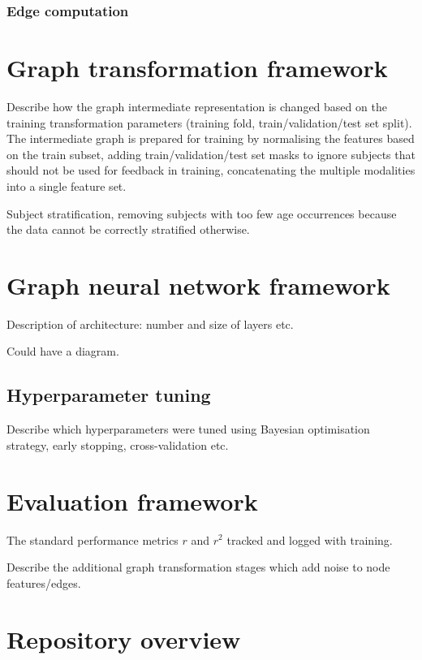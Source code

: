 \subsubsection{Edge computation}



\section{Graph transformation framework}
Describe how the graph intermediate representation is changed based on the training transformation parameters (training fold, train/validation/test set split). The intermediate graph is prepared for training by normalising the features based on the train subset, adding train/validation/test set masks to ignore subjects that should not be used for feedback in training, concatenating the multiple modalities into a single feature set.

Subject stratification, removing subjects with too few age occurrences because the data cannot be correctly stratified otherwise.


\section{Graph neural network framework}
Description of architecture: number and size of layers etc.

Could have a diagram.

\subsection{Hyperparameter tuning}
Describe which hyperparameters were tuned using Bayesian optimisation strategy, early stopping, cross-validation etc.


\section{Evaluation framework}
The standard performance metrics $r$ and $r^2$ tracked and logged with training.

Describe the additional graph transformation stages which add noise to node features/edges.


\section{Repository overview}

